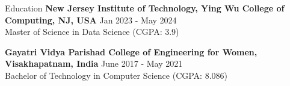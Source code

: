 \documentclass{resume} %
\begin{document}
\begin{rSection}{Education}
                        \textbf{New Jersey Institute of Technology, Ying Wu College of Computing, NJ, USA} \hfill {Jan 2023 - May 2024} \\
                            {Master of Science in Data Science (CGPA: 3.9)}
                         
             
         
                        \textbf{Gayatri Vidya Parishad College of Engineering for Women, Visakhapatnam, India} \hfill {June 2017 - May 2021} \\
                            {Bachelor of Technology in Computer Science (CGPA: 8.086)}
                         
             
         
    \end{rSection}
\end{document}
